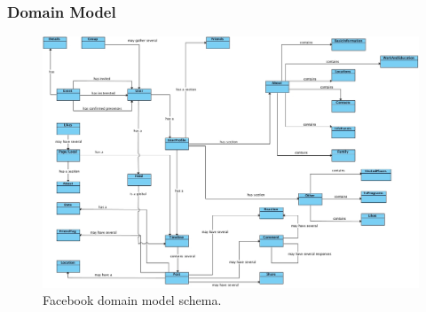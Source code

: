 \subsubsection*{Domain Model}

\begin{figure}[h!]
  \hspace*{-1in}
  \includegraphics[width=1.28\textwidth]{img/facebook-domain-model.jpg}
\caption{\label{img:fbdomain} Facebook domain model schema.}
\end{figure}

